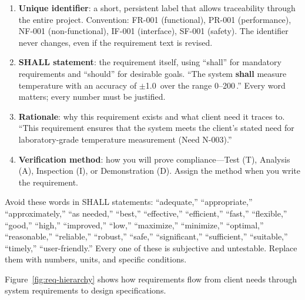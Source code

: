 \begin{enumerate}[nosep,leftmargin=1.5em]
\item \textbf{Unique identifier}: a short, persistent label that allows traceability through the entire project. Convention: FR-001 (functional), PR-001 (performance), NF-001 (non-functional), IF-001 (interface), SF-001 (safety). The identifier never changes, even if the requirement text is revised.
\item \textbf{SHALL statement}: the requirement itself, using ``shall'' for mandatory requirements and ``should'' for desirable goals. ``The system \textbf{shall} measure temperature with an accuracy of $\pm$1.0\,\degC{} over the range 0--200\,\degC{}.'' Every word matters; every number must be justified.
\item \textbf{Rationale}: why this requirement exists and what client need it traces to. ``This requirement ensures that the system meets the client's stated need for laboratory-grade temperature measurement (Need N-003).''
\item \textbf{Verification method}: how you will prove compliance---Test (T), Analysis (A), Inspection (I), or Demonstration (D). Assign the method when you write the requirement.
\end{enumerate}

\begin{warningbox}
Avoid these words in SHALL statements: ``adequate,'' ``appropriate,'' ``approximately,'' ``as needed,'' ``best,'' ``effective,'' ``efficient,'' ``fast,'' ``flexible,'' ``good,'' ``high,'' ``improved,'' ``low,'' ``maximize,'' ``minimize,'' ``optimal,'' ``reasonable,'' ``reliable,'' ``robust,'' ``safe,'' ``significant,'' ``sufficient,'' ``suitable,'' ``timely,'' ``user-friendly.'' Every one of these is subjective and untestable. Replace them with numbers, units, and specific conditions.
\end{warningbox}

Figure~\ref{fig:req-hierarchy} shows how requirements flow from client needs through system requirements to design specifications.

